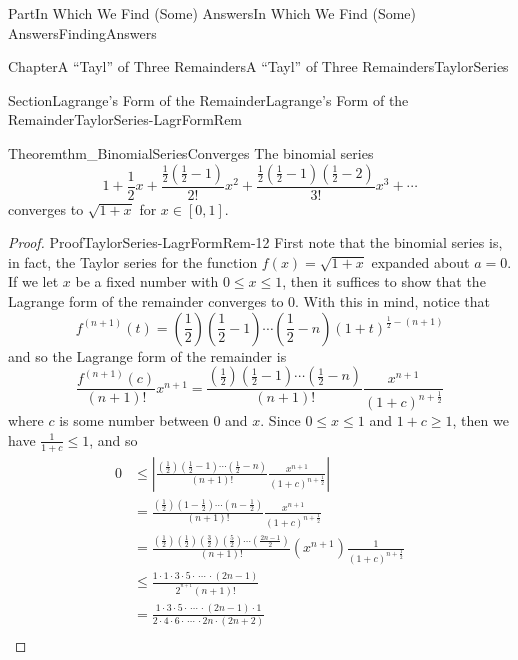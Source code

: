 \documentclass[oneside,10pt,]{book}
\numberwithin{equation}{part}
\newcommand{\amp}{&}
\begin{document}
\begin{partptx}{Part}{In Which We Find (Some) Answers}{}{In Which We Find (Some) Answers}{}{}{FindingAnswers}
\begin{chapterptx}{Chapter}{A ``Tayl'' of Three Remainders}{}{A ``Tayl'' of Three Remainders}{}{}{TaylorSeries}
\begin{sectionptx}{Section}{Lagrange's Form of the Remainder}{}{Lagrange's Form of the Remainder}{}{}{TaylorSeries-LagrFormRem}
\begin{theorem}{Theorem}{}{}{thm_BinomialSeriesConverges}%
%
%
The binomial series%
\begin{equation*}
1+\frac{1}{2}x+\frac{\frac{1}{2}\left(\frac{1}{2}-1\right)}{2!}x^2+\frac{\frac{1}{2}\left(\frac{1}{2}-1\right)\left(\frac{1}{2}-2\right)}{3!}x^3+\cdots
\end{equation*}
converges to \(\sqrt{1+x}\) for \(x\in[0,1]\).%
\end{theorem}
\begin{proof}{Proof}{}{TaylorSeries-LagrFormRem-12}
First note that the binomial series is, in fact, the Taylor series for the function \(f(x)=\sqrt{1+x}\) expanded about \(a=0\). If we let \(x\) be a fixed number with \(0\leq x\leq 1\), then it suffices to show that the Lagrange form of the remainder converges to \(0\). With this in mind, notice that%
\begin{equation*}
f^{(n+1)}(t)=\left(\frac{1}{2}\right)\left(\frac{1}{2}-1\right)\cdots\left(\frac{1}{2}-n\right)\left(1+t\right)^{\frac{1}{2}-(n+1)}
\end{equation*}
and so the Lagrange form of the remainder is%
\begin{equation*}
\frac{f^{(n+1)}(c)}{(n+1)!}x^{n+1}= \frac{\left(\frac{1}{2}\right)\left(\frac{1}{2}-1\right)\cdots \left(\frac{1}{2}-n\right)}{(n+1)!}\frac{x^{n+1}}{(1+c)^{n+\frac{1}{2}}}
\end{equation*}
where \(c\) is some number between \(0\) and \(x\). Since \(0\leq x\leq 1\) and \(1+c\geq 1\), then we have \(\frac{1}{1+c}\leq 1\), and so%
\begin{align*}
0\amp \leq \left|\frac{\left(\frac{1}{2}\right)\left(\frac{1}{2}-1\right)\cdots\left(\frac{1}{2}-n\right)}{(n+1)!}\frac{x^{n+1}}{(1+c)^{n+\frac{1}{2}}}\right|\\
\amp =\frac{\left(\frac{1}{2}\right)\left(1-\frac{1}{2}\right)\cdots\left(n-\frac{1}{2}\right)}{(n+1)!}\frac{x^{n+1}}{(1+c)^{n+\frac{1}{2}}}\\
\amp =\frac{\left(\frac{1}{2}\right)\left(\frac{1}{2}\right)\left(\frac{3}{2}\right)\left(\frac{5}{2}\right)\cdots\left(\frac{2n-1}{2}\right)}{(n+1)!}\left(x^{n+1}\right)\frac{1}{(1+c)^{n+\frac{1}{2}}}\\
\amp \leq\frac{1\cdot 1\cdot 3\cdot5\cdot\,\cdots\,\cdot\left(2n-1\right)}{2^{^{n+1}}(n+1)!}\\
\amp =\frac{1\cdot 3\cdot 5\cdot\,\cdots\,\cdot\left(2n-1\right)\cdot 1}{2\cdot4\cdot 6\cdot\,\cdots\,\cdot 2n\cdot\left(2n+2\right)}\\

\end{align*}
\end{proof}
\end{sectionptx}
\end{chapterptx}
\end{partptx}
\end{document}
